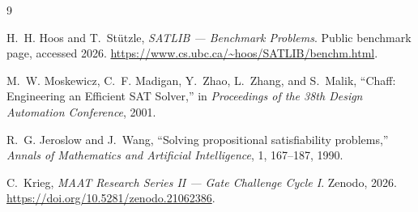 \documentclass[11pt,a4paper]{article}
\begin{document}
\begin{thebibliography}{9}

H.~H. Hoos and T.~Stützle,
\emph{SATLIB --- Benchmark Problems}.
Public benchmark page, accessed 2026.
\url{https://www.cs.ubc.ca/~hoos/SATLIB/benchm.html}.

M.~W. Moskewicz, C.~F. Madigan, Y.~Zhao, L.~Zhang, and S.~Malik,
``Chaff: Engineering an Efficient SAT Solver,''
in \emph{Proceedings of the 38th Design Automation Conference}, 2001.

R.~G. Jeroslow and J.~Wang,
``Solving propositional satisfiability problems,''
\emph{Annals of Mathematics and Artificial Intelligence}, 1, 167--187, 1990.

C.~Krieg,
\emph{MAAT Research Series II --- Gate Challenge Cycle I}.
Zenodo, 2026.
\url{https://doi.org/10.5281/zenodo.21062386}.

\end{thebibliography}
\end{document}
